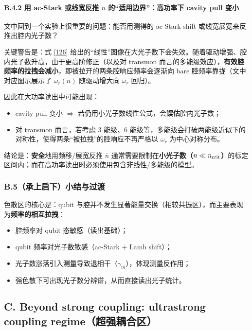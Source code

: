 \documentclass[12pt,a4paper,oneside]{ctexbook}
\let\oldparagraph\paragraph
\renewcommand{\paragraph}[1]{\oldparagraph{#1}\mbox{}}
\begin{document}
\paragraph{B.4.2 用 ac-Stark 或线宽反推 $\bar n$ 的“适用边界”：高功率下 cavity pull 变小}
文中回到一个实验上很重要的问题：能否用测得的 ac-Stark shift 或线宽展宽来反推出腔内光子数？

关键警告是：式 \eqref{126} 给出的“线性”图像在大光子数下会失效。随着驱动增强、腔内光子数升高，由于更高阶修正（以及对 transmon 而言的多能级效应），\textbf{有效腔频率的拉拽会减小}，即被拉开的两条腔响应频率会逐渐向 bare 腔频率靠拢（文中对应图示展示了 $\omega_r(n)$ 随驱动增大向 $\omega_r$ 回归）。

因此在大功率读出中可能出现：
\begin{itemize}
  \item cavity pull 变小 $\Rightarrow$ 若仍用小光子数线性公式，会\textbf{误估}腔内光子数；
  \item 对 transmon 而言，若考虑 3 能级、6 能级等，多能级会打破两能级近似下的对称性，使得两条“被拉拽”的腔响应不再严格以 $\omega_r$ 为中心对称分布。
\end{itemize}
结论是：\textbf{安全}地用频移/展宽反推 $\bar n$ 通常需要限制在\textbf{小光子数（$n\ll n_{\rm crit}$）}的标定区间内；而在高功率读出时必须使用包含非线性/多能级的模型。

\subsubsection{B.5（承上启下）小结与过渡}
色散区的核心是：qubit 与腔并不发生显著能量交换（相较共振区），而主要表现为\textbf{频率的相互拉拽}：
\begin{itemize}
  \item 腔频率对 qubit 态敏感（读出基础）；
  \item qubit 频率对光子数敏感（ac-Stark + Lamb shift）；
  \item 光子数涨落引入测量导致退相干（$\gamma_m$），体现测量反作用；
  \item 强色散下可出现光子数分辨谱，从而直接读出光子统计。
\end{itemize}


\subsection{C. Beyond strong coupling: ultrastrong coupling regime（超强耦合区）}
\end{document}
